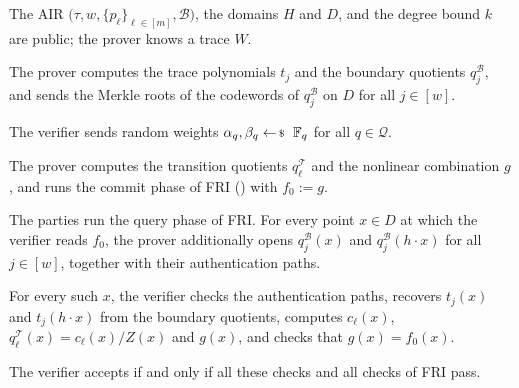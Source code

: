 \documentclass[../../book]{subfiles}
\begin{document}
\begin{definition}\label{def:stark}
  The AIR $\big(\tau, w, \{p_\ell\}_{\ell \in [m]}, \mathcal{B}\big)$, the domains $H$ and $D$, and the
  degree bound $k$ are public; the prover knows a trace $W$.
  \begin{algoen}
    \item The prover computes the trace polynomials $t_j$ and the boundary quotients $q^{\mathcal{B}}_j$,
    and sends the Merkle roots of the codewords of $q^{\mathcal{B}}_j$ on $D$ for all $j \in [w]$.
    \item The verifier sends random weights $\alpha_q, \beta_q \leftarrowS \mathbb{F}_q$ for all
    $q \in \mathcal{Q}$.
    \item The prover computes the transition quotients $q^{\mathcal{T}}_\ell$ and the nonlinear
    combination $g$, and runs the commit phase of FRI () with $f_0 := g$.
    \item The parties run the query phase of FRI. For every point $x \in D$ at which the verifier reads
    $f_0$, the prover additionally opens $q^{\mathcal{B}}_j(x)$ and $q^{\mathcal{B}}_j(h \cdot x)$ for all
    $j \in [w]$, together with their authentication paths.
    \item For every such $x$, the verifier checks the authentication paths, recovers $t_j(x)$ and
    $t_j(h \cdot x)$ from the boundary quotients, computes $c_\ell(x)$,
    $q^{\mathcal{T}}_\ell(x) = c_\ell(x)/Z(x)$ and $g(x)$, and checks that $g(x) = f_0(x)$.
  \end{algoen}
  The verifier accepts if and only if all these checks and all checks of FRI pass.
\end{definition}
\end{document}
